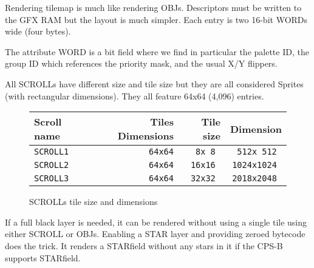 Rendering tilemap is much like rendering OBJs. Descriptors must be written to the GFX RAM but the layout is much simpler. Each entry is two 16-bit WORDs wide (four bytes).

 

The attribute WORD is a bit field where we find in particular the palette ID, the group ID which references the priority mask, and the usual X/Y flippers.

 

All SCROLLs have different size and tile size but they are all considered Sprites (with rectangular dimensions). They all feature 64x64 (4,096) entries. 

 \begin{figure}[H]
\begin{tabularx}{\textwidth}{Xrrr}
  \toprule    
  \textbf{Scroll name } & \textbf{ Tiles Dimensions } & \textbf{ Tile size }  & \textbf{Dimension }\\  
  \toprule   
    
\texttt{SCROLL1} & \texttt{64x64} & \texttt{8x 8 } &  \texttt{512x 512 }  \\  
\texttt{SCROLL2} & \texttt{64x64} & \texttt{16x16 } &  \texttt{1024x1024 }   \\  
\texttt{SCROLL3} & \texttt{64x64} & \texttt{32x32 } &  \texttt{2018x2048 }   \\  
  \toprule   
\end{tabularx}
\vspace*{-1mm} %
\caption*{SCROLLs tile size and dimensions}
\end{figure}

If a full black layer is needed, it can be rendered without using a single tile using either SCROLL or OBJs. Enabling a STAR layer and providing zeroed bytecode does the trick. It renders a STARfield without any stars in it if the CPS-B supports STARfield.
























